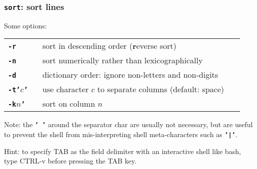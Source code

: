\begin{frame}[shrink]
\frametitle{\textbf{\tt{sort}}: sort lines}
Some options:


\begin{center}
\begin{tabular}{lll}

  \begin{minipage}{2cm}{\bf{\textbf{\tt{-r}}}} ~\end{minipage}
   & \begin{minipage}{9cm}sort in descending order ({\bf{r}}everse sort)~\end{minipage}
\\[1ex]

  \begin{minipage}{2cm}{\bf{\textbf{\tt{-n}}}} ~\end{minipage}
   & \begin{minipage}{9cm}sort numerically rather than lexicographically~\end{minipage}
\\[1ex]

  \begin{minipage}{2cm}{\bf{\textbf{\tt{-d}}}} ~\end{minipage}
   & \begin{minipage}{9cm}dictionary order: ignore non-letters and non-digits~\end{minipage}
\\[1ex]

  \begin{minipage}{2cm}{\bf{\textbf{\tt{-t'}}$c$\textbf{\tt{'}}}} ~\end{minipage}
   & \begin{minipage}{9cm}use character $c$ to separate columns (default: space)~\end{minipage}
\\[1ex]

  \begin{minipage}{2cm}{\bf{\textbf{\tt{-k}}$n$\textbf{\tt{'}}}} ~\end{minipage}
   & \begin{minipage}{9cm}sort on column $n$~\end{minipage}
\\[1ex]
\end{tabular}
\end{center}

{\small Note: the \textbf{\tt{' '}} around the separator char are usually not necessary,
but are useful to prevent the shell from mis-interpreting shell meta-characters
such as \textbf{\tt{'|'}}.}

{\small Hint: to specify TAB as the field delimiter with an interactive shell like bash, type CTRL-v before pressing the TAB key.}
\end{frame}

